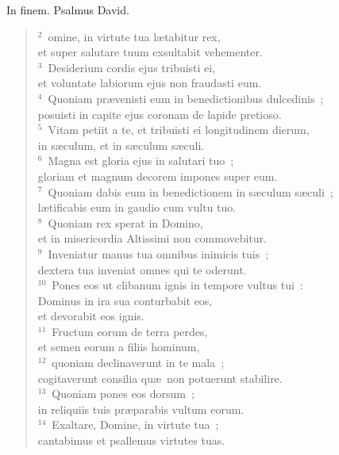 \bchapter[Psalm]
In finem. Psalmus David.
\begin{verse}${}^{2}$~omine, in virtute tua l\ae tabitur rex,\\ et super salutare tuum exsultabit vehementer.\\
${}^{3}$~Desiderium cordis ejus tribuisti ei,\\ et voluntate labiorum ejus non fraudasti eum.\\
${}^{4}$~Quoniam pr\ae venisti eum in benedictionibus dulcedinis~;\\ posuisti in capite ejus coronam de lapide pretioso.\\
${}^{5}$~Vitam petiit a te, et tribuisti ei longitudinem dierum,\\ in s\ae culum, et in s\ae culum s\ae culi.\\
${}^{6}$~Magna est gloria ejus in salutari tuo~;\\ gloriam et magnum decorem impones super eum.\\
${}^{7}$~Quoniam dabis eum in benedictionem in s\ae culum s\ae culi~;\\ l\ae tificabis eum in gaudio cum vultu tuo.\\
${}^{8}$~Quoniam rex sperat in Domino,\\ et in misericordia Altissimi non commovebitur.\\
${}^{9}$~Inveniatur manus tua omnibus inimicis tuis~;\\ dextera tua inveniat omnes qui te oderunt.\\
${}^{10}$~Pones eos ut clibanum ignis in tempore vultus tui~:\\ Dominus in ira sua conturbabit eos,\\ et devorabit eos ignis.\\
${}^{11}$~Fructum eorum de terra perdes,\\ et semen eorum a filiis hominum,\\
${}^{12}$~quoniam declinaverunt in te mala~;\\ cogitaverunt consilia qu\ae\ non potuerunt stabilire.\\
${}^{13}$~Quoniam pones eos dorsum~;\\ in reliquiis tuis pr\ae parabis vultum eorum.\\
${}^{14}$~Exaltare, Domine, in virtute tua~;\\ cantabimus et psallemus virtutes tuas.\end{verse}



